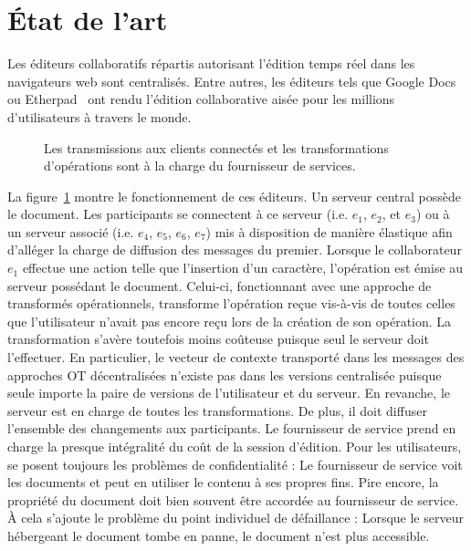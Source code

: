 
\section{État de l'art}
\label{editor:sec:stateoftheart}

Les éditeurs collaboratifs répartis autorisant l'édition temps réel dans les
navigateurs web sont centralisés. Entre autres, les éditeurs tels que Google
Docs~\cite{googledocs} ou Etherpad~\cite{etherpad} ont rendu l'édition
collaborative aisée pour les millions d'utilisateurs à travers le monde.

\begin{figure}
  \begin{center}
    
    \caption[Fonctionnement des éditeurs centralisés]
    {\label{editor:fig:serviceprovider} Les transmissions aux clients connectés
      et les transformations d'opérations sont à la charge du fournisseur de
      services.}
  \end{center}
\end{figure}

La figure~\ref{editor:fig:serviceprovider} montre le fonctionnement de ces
éditeurs. Un serveur central possède le document. Les participants se connectent
à ce serveur (i.e. $e_1$, $e_2$, et $e_3$) ou à un serveur associé (i.e. $e_4$,
$e_5$, $e_6$, $e_7$) mis à disposition de manière élastique afin d'alléger la
charge de diffusion des messages du premier. Lorsque le collaborateur $e_1$
effectue une action telle que l'insertion d'un caractère, l'opération est émise
au serveur possédant le document. Celui-ci, fonctionnant avec une approche de
transformés opérationnels, transforme l'opération reçue vis-à-vis de toutes
celles que l'utilisateur n'avait pas encore reçu lors de la création de son
opération. La transformation s'avère toutefois moins coûteuse puisque seul le
serveur doit l'effectuer. En particulier, le vecteur de contexte transporté dans
les messages des approches OT décentralisées n'existe pas dans les versions
centralisée puisque seule importe la paire de versions de l'utilisateur et du
serveur. En revanche, le serveur est en charge de toutes les transformations. De
plus, il doit diffuser l'ensemble des changements aux participants. Le
fournisseur de service prend en charge la presque intégralité du coût de la
session d'édition. Pour les utilisateurs, se posent toujours les problèmes de
confidentialité : Le fournisseur de service voit les documents et peut en
utiliser le contenu à ses propres fins. Pire encore, la propriété du document
doit bien souvent être accordée au fournisseur de service. À cela s'ajoute le
problème du point individuel de défaillance : Lorsque le serveur hébergeant le
document tombe en panne, le document n'est plus accessible.

